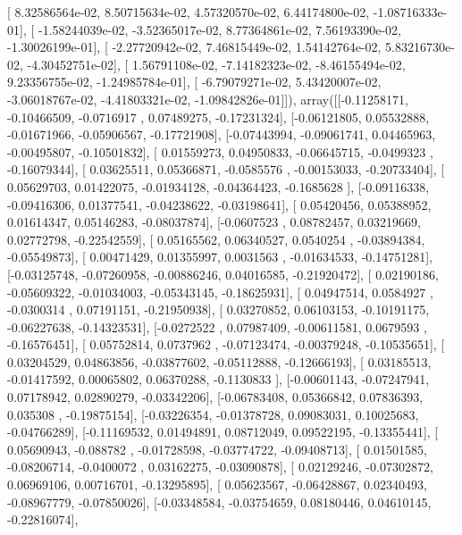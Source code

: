 \documentclass{article}
\begin{document}
       [  8.32586564e-02,   8.50715634e-02,   4.57320570e-02,
          6.44174800e-02,  -1.08716333e-01],
       [ -1.58244039e-02,  -3.52365017e-02,   8.77364861e-02,
          7.56193390e-02,  -1.30026199e-01],
       [ -2.27720942e-02,   7.46815449e-02,   1.54142764e-02,
          5.83216730e-02,  -4.30452751e-02],
       [  1.56791108e-02,  -7.14182323e-02,  -8.46155494e-02,
          9.23356755e-02,  -1.24985784e-01],
       [ -6.79079271e-02,   5.43420007e-02,  -3.06018767e-02,
         -4.41803321e-02,  -1.09842826e-01]]), array([[-0.11258171, -0.10466509, -0.0716917 ,  0.07489275, -0.17231324],
       [-0.06121805,  0.05532888, -0.01671966, -0.05906567, -0.17721908],
       [-0.07443994, -0.09061741,  0.04465963, -0.00495807, -0.10501832],
       [ 0.01559273,  0.04950833, -0.06645715, -0.0499323 , -0.16079344],
       [ 0.03625511,  0.05366871, -0.0585576 , -0.00153033, -0.20733404],
       [ 0.05629703,  0.01422075, -0.01934128, -0.04364423, -0.1685628 ],
       [-0.09116338, -0.09416306,  0.01377541, -0.04238622, -0.03198641],
       [ 0.05420456,  0.05388952,  0.01614347,  0.05146283, -0.08037874],
       [-0.0607523 ,  0.08782457,  0.03219669,  0.02772798, -0.22542559],
       [ 0.05165562,  0.06340527,  0.0540254 , -0.03894384, -0.05549873],
       [ 0.00471429,  0.01355997,  0.0031563 , -0.01634533, -0.14751281],
       [-0.03125748, -0.07260958, -0.00886246,  0.04016585, -0.21920472],
       [ 0.02190186, -0.05609322, -0.01034003, -0.05343145, -0.18625931],
       [ 0.04947514,  0.0584927 , -0.0300314 ,  0.07191151, -0.21950938],
       [ 0.03270852,  0.06103153, -0.10191175, -0.06227638, -0.14323531],
       [-0.0272522 ,  0.07987409, -0.00611581,  0.0679593 , -0.16576451],
       [ 0.05752814,  0.0737962 , -0.07123474, -0.00379248, -0.10535651],
       [ 0.03204529,  0.04863856, -0.03877602, -0.05112888, -0.12666193],
       [ 0.03185513, -0.01417592,  0.00065802,  0.06370288, -0.1130833 ],
       [-0.00601143, -0.07247941,  0.07178942,  0.02890279, -0.03342206],
       [-0.06783408,  0.05366842,  0.07836393,  0.035308  , -0.19875154],
       [-0.03226354, -0.01378728,  0.09083031,  0.10025683, -0.04766289],
       [-0.11169532,  0.01494891,  0.08712049,  0.09522195, -0.13355441],
       [ 0.05690943, -0.088782  , -0.01728598, -0.03774722, -0.09408713],
       [ 0.01501585, -0.08206714, -0.0400072 ,  0.03162275, -0.03090878],
       [ 0.02129246, -0.07302872,  0.06969106,  0.00716701, -0.13295895],
       [ 0.05623567, -0.06428867,  0.02340493, -0.08967779, -0.07850026],
       [-0.03348584, -0.03754659,  0.08180446,  0.04610145, -0.22816074],
\end{document}
